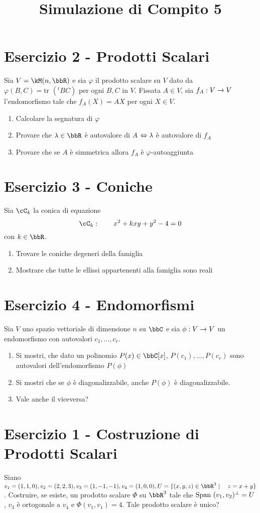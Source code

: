 \documentclass[a4paper,NoNotes,GeneralMath]{stdmdoc}
\begin{document}
	\section*{Esercizio 2 - Prodotti Scalari}
	Sia $V = \kM(n, \bbR)$ e sia $\varphi$ il prodotto scalare su $V$ dato da $\varphi(B,C) = \text{tr }({}^tBC)$ per ogni $B, C$ in $V$. Fissata $A \in V$, sia $f_A: V \rightarrow V$ l'endomorfismo tale che $f_A(X) = AX$ per ogni $X\in V$.
	\begin{enumerate}
		\item Calcolare la segnatura di $\varphi$
		\item Provare che $\lambda \in \bbR$ è autovalore di $A$ $\Leftrightarrow \lambda$ è autovalore di $f_A$
		\item Provare che se $A$ è simmetrica allora $f_A$ è $\varphi$-autoaggiunta
	\end{enumerate}

	\section*{Esercizio 3 - Coniche}
	Sia $\cC_k$ la conica di equazione $$ \cC_k : \qquad x^2+kxy+y^2-4 = 0$$ con $k\in \bbR$.
	\begin{enumerate}
		\item Trovare le coniche degeneri della famiglia
		\item Mostrare che tutte le ellissi appartenenti alla famiglia sono reali
	\end{enumerate}

	\section*{Esercizio 4 - Endomorfismi}
	Sia $V$ uno spazio vettoriale di dimensione $n$ su $\bbC$ e sia $\phi: V \rightarrow V$ un endomorfismo con autovalori $c_1, \ldots, c_r$.
	\begin{enumerate}
		\item Si mostri, che dato un polinomio $P(x) \in \bbC[x]$, $P(c_1), \ldots, P(c_r)$ sono autovalori dell'endomorfismo $P(\phi)$
		\item Si mostri che se $\phi$ è diagonalizzabile, anche $P(\phi)$ è diagonalizzabile.
		\item Vale anche il viceversa?
	\end{enumerate}

	\newpage
	\title{Simulazione di Compito 5}
	\section*{Esercizio 1 - Costruzione di Prodotti Scalari}
	Siano $v_1 = (1,1,0), v_2 = (2,2,3), v_3=(1,-1,-1), v_4=(1,0,0), U = \{(x,y,z)\in\bbR^3 \mid \quad z = x+y\}$. Costruire, se esiste, un prodotto scalare $\Phi$ su $\bbR^3$ tale che $\mbox{Span }(v_1,v_2)^\bot = U$, $v_3$ è ortogonale a $v_4$ e $\Phi(v_1,v_1) = 4$. Tale prodotto scalare è unico?
	
\end{document}
